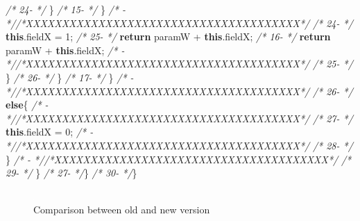\documentclass[
]{article}
\newenvironment{Shaded}{\begin{snugshade}}{\end{snugshade}}
\newcommand{\CommentTok}[1]{\textcolor[rgb]{0.56,0.35,0.01}{\textit{#1}}}
\newcommand{\DecValTok}[1]{\textcolor[rgb]{0.00,0.00,0.81}{#1}}
\newcommand{\FunctionTok}[1]{\textcolor[rgb]{0.00,0.00,0.00}{#1}}
\newcommand{\KeywordTok}[1]{\textcolor[rgb]{0.13,0.29,0.53}{\textbf{#1}}}
\newcommand{\NormalTok}[1]{#1}
\begin{document}
\begin{landscape}
\begin{Shaded}
\begin{Highlighting}[]
\CommentTok{/* 24-                 */}\NormalTok{        \}                                                      }\CommentTok{/* 15-                 */}\NormalTok{        \}                                                      }
\CommentTok{/*   -                 *//*XXXXXXXXXXXXXXXXXXXXXXXXXXXXXXXXXXXXXX*/}                     \CommentTok{/* 24-                 */}            \KeywordTok{this}\NormalTok{.}\FunctionTok{fieldX}\NormalTok{ = }\DecValTok{1}\NormalTok{;                                   }
\CommentTok{/* 25-                 */}        \KeywordTok{return}\NormalTok{ paramW + }\KeywordTok{this}\NormalTok{.}\FunctionTok{fieldX}\NormalTok{;                           }\CommentTok{/* 16-                 */}        \KeywordTok{return}\NormalTok{ paramW + }\KeywordTok{this}\NormalTok{.}\FunctionTok{fieldX}\NormalTok{;                           }
\CommentTok{/*   -                 *//*XXXXXXXXXXXXXXXXXXXXXXXXXXXXXXXXXXXXXX*/}                     \CommentTok{/* 25-                 */}\NormalTok{        \}                                                                }
\CommentTok{/* 26-                 */}\NormalTok{     \}                                                         }\CommentTok{/* 17-                 */}\NormalTok{     \}                                                         }
\CommentTok{/*   -                 *//*XXXXXXXXXXXXXXXXXXXXXXXXXXXXXXXXXXXXXX*/}                     \CommentTok{/* 26-                 */}        \KeywordTok{else}\NormalTok{\{                                                  }
\CommentTok{/*   -                 *//*XXXXXXXXXXXXXXXXXXXXXXXXXXXXXXXXXXXXXX*/}                     \CommentTok{/* 27-                 */}            \KeywordTok{this}\NormalTok{.}\FunctionTok{fieldX}\NormalTok{ = }\DecValTok{0}\NormalTok{;                                   }
\CommentTok{/*   -                 *//*XXXXXXXXXXXXXXXXXXXXXXXXXXXXXXXXXXXXXX*/}                     \CommentTok{/* 28-                 */}\NormalTok{        \}                                                      }
\CommentTok{/*   -                 *//*XXXXXXXXXXXXXXXXXXXXXXXXXXXXXXXXXXXXXX*/}                     \CommentTok{/* 29-                 */}\NormalTok{    \}                                                          }
\CommentTok{/* 27-                 */}\NormalTok{\}                                                              }\CommentTok{/* 30-                 */}\NormalTok{\}                                                              }
\end{Highlighting}
\end{Shaded}

\normalsize

\begin{figure}
\centering
\includegraphics{figures/fake.png}
\caption{Comparison between old and new version
\label{comparison_changing_method_order}}
\end{figure}

\end{landscape}
\end{document}
